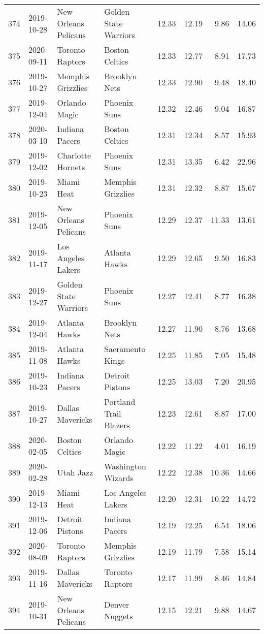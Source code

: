 \documentclass[
  11pt,
]{article}
\theoremstyle{nonumberplain}
\begin{document}
\begin{longtable}{rl|llr|rrr}
374 & 2019-10-28 & New Orleans Pelicans & Golden State Warriors & 12.33 & 12.19 & 9.86 & 14.06\\
375 & 2020-09-11 & Toronto Raptors & Boston Celtics & 12.33 & 12.77 & 8.91 & 17.73\\
376 & 2019-10-27 & Memphis Grizzlies & Brooklyn Nets & 12.33 & 12.90 & 9.48 & 18.40\\
377 & 2019-12-04 & Orlando Magic & Phoenix Suns & 12.32 & 12.46 & 9.04 & 16.87\\
378 & 2020-03-10 & Indiana Pacers & Boston Celtics & 12.31 & 12.34 & 8.57 & 15.93\\
379 & 2019-12-02 & Charlotte Hornets & Phoenix Suns & 12.31 & 13.35 & 6.42 & 22.96\\
380 & 2019-10-23 & Miami Heat & Memphis Grizzlies & 12.31 & 12.32 & 8.87 & 15.67\\
381 & 2019-12-05 & New Orleans Pelicans & Phoenix Suns & 12.29 & 12.37 & 11.33 & 13.61\\
382 & 2019-11-17 & Los Angeles Lakers & Atlanta Hawks & 12.29 & 12.65 & 9.50 & 16.83\\
383 & 2019-12-27 & Golden State Warriors & Phoenix Suns & 12.27 & 12.41 & 8.77 & 16.38\\
384 & 2019-12-04 & Atlanta Hawks & Brooklyn Nets & 12.27 & 11.90 & 8.76 & 13.68\\
385 & 2019-11-08 & Atlanta Hawks & Sacramento Kings & 12.25 & 11.85 & 7.05 & 15.48\\
386 & 2019-10-23 & Indiana Pacers & Detroit Pistons & 12.25 & 13.03 & 7.20 & 20.95\\
387 & 2019-10-27 & Dallas Mavericks & Portland Trail Blazers & 12.23 & 12.61 & 8.87 & 17.00\\
388 & 2020-02-05 & Boston Celtics & Orlando Magic & 12.22 & 11.22 & 4.01 & 16.19\\
389 & 2020-02-28 & Utah Jazz & Washington Wizards & 12.22 & 12.38 & 10.36 & 14.66\\
390 & 2019-12-13 & Miami Heat & Los Angeles Lakers & 12.20 & 12.31 & 10.22 & 14.72\\
391 & 2019-12-06 & Detroit Pistons & Indiana Pacers & 12.19 & 12.25 & 6.54 & 18.06\\
392 & 2020-08-09 & Toronto Raptors & Memphis Grizzlies & 12.19 & 11.79 & 7.58 & 15.14\\
393 & 2019-11-16 & Dallas Mavericks & Toronto Raptors & 12.17 & 11.99 & 8.46 & 14.84\\
394 & 2019-10-31 & New Orleans Pelicans & Denver Nuggets & 12.15 & 12.21 & 9.88 & 14.67\\

\end{longtable}
\end{document}
